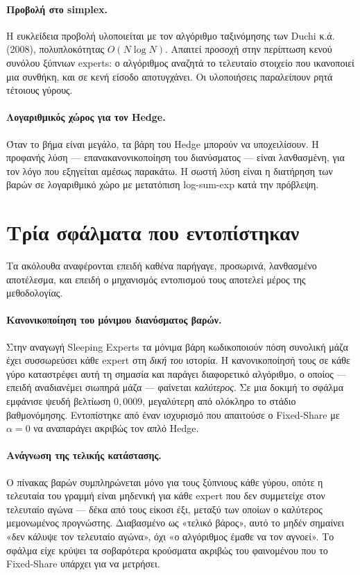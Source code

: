 \documentclass[12pt,a4paper,oneside]{report}
\renewcommand{\_}{\oldunderscore\allowbreak}
\theoremstyle{definition}
\theoremstyle{plain}
\theoremstyle{remark}
\begin{document}
\paragraph{Προβολή στο simplex.} Η ευκλείδεια προβολή υλοποιείται με τον αλγόριθμο
ταξινόμησης των Duchi κ.ά. (2008), πολυπλοκότητας $O(N\log N)$. Απαιτεί προσοχή στην
περίπτωση κενού συνόλου ξύπνιων experts: ο αλγόριθμος αναζητά το τελευταίο στοιχείο που
ικανοποιεί μια συνθήκη, και σε κενή είσοδο αποτυγχάνει. Οι υλοποιήσεις παραλείπουν ρητά
τέτοιους γύρους.

\paragraph{Λογαριθμικός χώρος για τον Hedge.} Όταν το βήμα είναι μεγάλο, τα βάρη του Hedge
μπορούν να υποχειλίσουν. Η προφανής λύση --- επανακανονικοποίηση του διανύσματος ---
είναι λανθασμένη, για τον λόγο που εξηγείται αμέσως παρακάτω. Η σωστή λύση είναι η διατήρηση
των βαρών σε λογαριθμικό χώρο με μετατόπιση log-sum-exp κατά την πρόβλεψη.

\section{Τρία σφάλματα που εντοπίστηκαν}
\label{sec:impl-bugs}

Τα ακόλουθα αναφέρονται επειδή καθένα παρήγαγε, προσωρινά, λανθασμένο αποτέλεσμα, και επειδή
ο μηχανισμός εντοπισμού τους αποτελεί μέρος της μεθοδολογίας.

\paragraph{Κανονικοποίηση του μόνιμου διανύσματος βαρών.} Στην αναγωγή Sleeping Experts τα
μόνιμα βάρη κωδικοποιούν πόση συνολική μάζα έχει συσσωρεύσει κάθε expert στη \emph{δική του}
ιστορία. Η κανονικοποίησή τους σε κάθε γύρο καταστρέφει αυτή τη σημασία και παράγει
διαφορετικό αλγόριθμο, ο οποίος --- επειδή αναδιανέμει σιωπηρά μάζα --- φαίνεται
\emph{καλύτερος}. Σε μια δοκιμή το σφάλμα εμφάνισε ψευδή βελτίωση $0{,}0009$, μεγαλύτερη από
ολόκληρο το στάδιο βαθμονόμησης. Εντοπίστηκε από έναν ισχυρισμό που απαιτούσε ο Fixed-Share
με $\alpha=0$ να αναπαράγει ακριβώς τον απλό Hedge.

\paragraph{Ανάγνωση της τελικής κατάστασης.} Ο πίνακας βαρών συμπληρώνεται μόνο για τους
ξύπνιους κάθε γύρου, οπότε η τελευταία του γραμμή είναι μηδενική για κάθε expert που δεν
συμμετείχε στον τελευταίο αγώνα --- δέκα από τους είκοσι έξι, μεταξύ των οποίων ο
καλύτερος μεμονωμένος προγνώστης. Διαβασμένο ως «τελικό βάρος», αυτό το μηδέν σημαίνει «δεν
κάλυψε τον τελευταίο αγώνα», όχι «ο αλγόριθμος έμαθε να τον αγνοεί». Το σφάλμα είχε κρύψει
τα σοβαρότερα κρούσματα ακριβώς του φαινομένου που το Fixed-Share υπάρχει για να μετρήσει.
\end{document}
